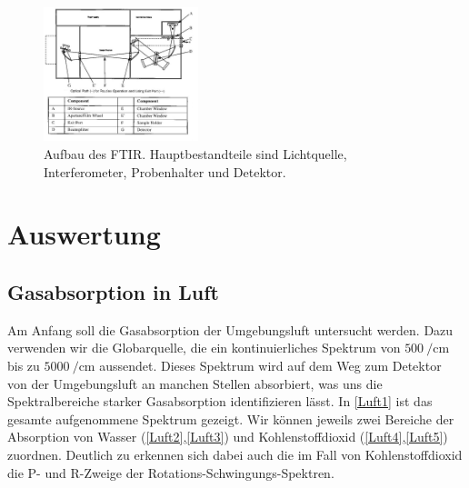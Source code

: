 \documentclass[paper=a4,fontsize=10pt,DIV=18,twocolumn,parskip=half]{scrartcl}
\numberwithin{equation}{section}    %
\begin{document}
\begin{figure}
\centering
    \includegraphics[width=0.4\textwidth]{Bilder/FTIR}
    \caption{Aufbau des FTIR. Hauptbestandteile sind Lichtquelle, 
    Interferometer, Probenhalter und Detektor.}
    \label{ftir}
\end{figure}


\section{Auswertung}

\subsection{Gasabsorption in Luft}
Am Anfang soll die Gasabsorption der Umgebungsluft untersucht werden.  Dazu 
verwenden wir die Globarquelle, die ein kontinuierliches Spektrum von 
$\SI{500}{\per\centi\meter}$ bis zu $\SI{5000}{\per\centi\meter}$ aussendet.  
Dieses Spektrum wird auf dem Weg zum Detektor von der Umgebungsluft an manchen 
Stellen absorbiert, was uns die Spektralbereiche starker Gasabsorption 
identifizieren lässt.
In \cref{Luft1} ist das gesamte aufgenommene Spektrum gezeigt.  Wir können 
jeweils zwei Bereiche der Absorption von Wasser (\cref{Luft2},\cref{Luft3}) und 
Kohlenstoffdioxid (\cref{Luft4},\cref{Luft5}) zuordnen.  Deutlich zu erkennen sich 
dabei auch die im Fall von Kohlenstoffdioxid die P- und R-Zweige der 
Rotations-Schwingungs-Spektren.
\end{document}

